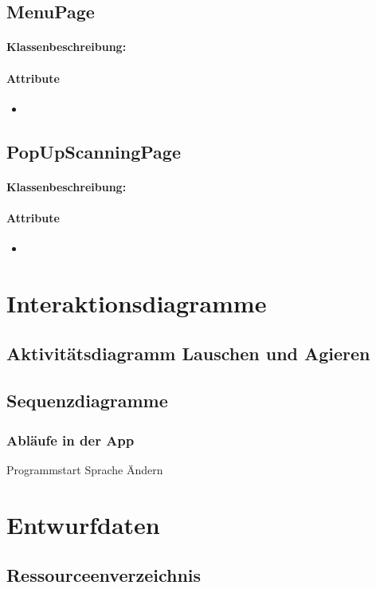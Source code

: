 \documentclass[a4paper,12pt]{article}
\begin{document}
	\subsection{MenuPage}
	\paragraph{Klassenbeschreibung:}
	\paragraph{Attribute}
		\begin{itemize}
			\item
		\end{itemize}

	\subsection{PopUpScanningPage}
	\paragraph{Klassenbeschreibung:}
	\paragraph{Attribute}
		\begin{itemize}
			\item
		\end{itemize}

\section{Interaktionsdiagramme}
\subsection{Aktivitätsdiagramm Lauschen und Agieren}
\subsection{Sequenzdiagramme}
\subsubsection{Abläufe in der App}
Programmstart
Sprache Ändern
\section{Entwurfdaten}
\subsection{Ressourceenverzeichnis}
\end{document}
